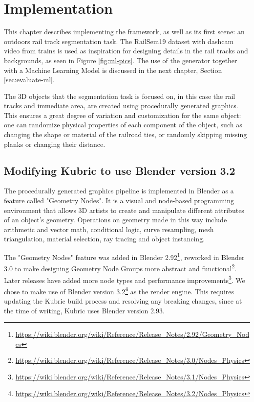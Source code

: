 \chapter{Implementation}
\label{chapter:implementation}


This chapter describes implementing the framework, as well as its first scene: an outdoors rail track segmentation task. The RailSem19 dataset with dashcam video from trains\cite{zendel2019railsem19} is used as inspiration for designing details in the rail tracks and backgrounds, as seen in Figure \ref{fig:ml-pics}. The use of the generator together with a Machine Learning Model is discussed in the next chapter, Section \ref{sec:evaluate-ml}.

The 3D objects that the segmentation task is focused on, in this case the rail tracks and immediate area, are created using procedurally generated graphics. This ensures a great degree of variation and customization for the same object: one can randomize physical properties of each component of the object, such as changing the shape or material of the railroad ties, or randomly skipping missing planks or changing their distance. 


\section{Modifying Kubric to use Blender version 3.2}
\label{sec:upgrading-kubric}

The procedurally generated graphics pipeline is implemented in Blender as a feature called "Geometry Nodes". It is a visual and node-based programming environment that allows 3D artists to create and manipulate different attributes of an object's geometry. Operations on geometry made in this way include arithmetic and vector math, conditional logic, curve resampling, mesh triangulation, material selection, ray tracing and object instancing.

The "Geometry Nodes" feature was added in Blender 2.92\footnote{\url{https://wiki.blender.org/wiki/Reference/Release_Notes/2.92/Geometry_Nodes}}, reworked in Blender 3.0 to make designing Geometry Node Groups more abstract and functional\footnote{\url{https://wiki.blender.org/wiki/Reference/Release_Notes/3.0/Nodes_Physics}}. Later releases have added more node types and performance improvements\footnote{\url{https://wiki.blender.org/wiki/Reference/Release_Notes/3.1/Nodes_Physics}}. We chose to make use of Blender version 3.2\footnote{\url{https://wiki.blender.org/wiki/Reference/Release_Notes/3.2/Nodes_Physics}} as the render engine. This requires updating the Kubric build process and resolving any breaking changes, since at the time of writing, Kubric uses Blender version 2.93.

